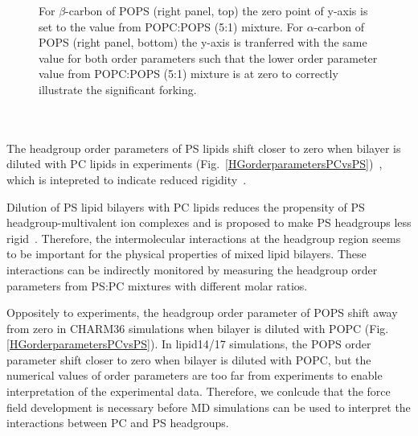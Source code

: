 \documentclass[aps,prl,superscriptaddress,twocolumn]{revtex4}
\begin{document}
\begin{figure}[]
{    For $\beta$-carbon of POPS (right panel, top) the zero point of y-axis is
    set to the value from POPC:POPS (5:1) mixture.
    For $\alpha$-carbon of POPS (right panel, bottom) the y-axis is tranferred
    with the same value for both order parameters such that the lower order
    parameter value from POPC:POPS (5:1) mixture is at zero
    to correctly illustrate the significant forking.
  }
   \\
   \\
   \\
\end{figure}

The headgroup order parameters of PS lipids
shift closer to zero when bilayer is diluted with PC lipids in 
experiments (Fig.~\ref{HGorderparametersPCvsPS})~\cite{browning80,scherer87,roux90},
which is intepreted to indicate reduced rigidity~\cite{browning80,buldt81}.



Dilution of PS lipid bilayers with PC lipids reduces the propensity
of PS headgroup-multivalent ion complexes and is proposed to make PS
headgroups less rigid~\cite{browning80,buldt81,roux90,roux91}.
Therefore, the intermolecular interactions at the headgroup region seems
to be important for the physical properties of mixed lipid bilayers.
These interactions can be indirectly monitored by measuring the
headgroup order parameters from PS:PC mixtures with different molar
ratios.



Oppositely to experiments, the headgroup order parameter of POPS shift away
from zero in CHARM36 simulations when bilayer is diluted with POPC (Fig. \ref{HGorderparametersPCvsPS}).
In lipid14/17 simulations, the POPS order parameter shift closer to zero when
bilayer is diluted with POPC, but the numerical values of order parameters
are too far from experiments to enable interpretation of the experimental data.
Therefore, we conlcude that the force field development is necessary before
MD simulations can be used to interpret the interactions between PC and PS headgroups.
\end{document}

